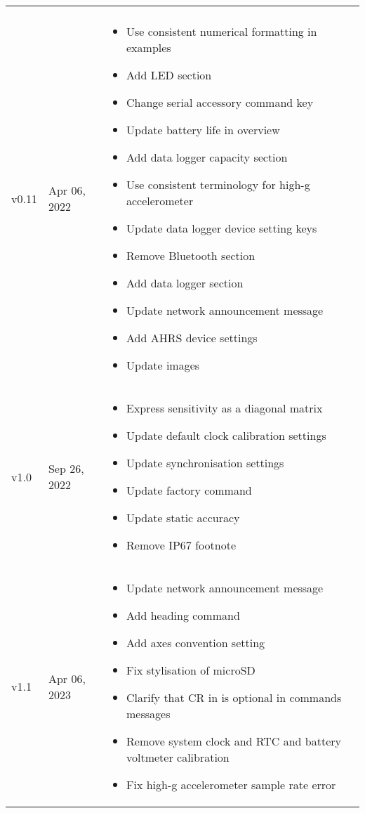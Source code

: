\begin{longtable}{| >{\centering}p{} | p{} | >{\raggedright\arraybackslash}p{} |}
\begin{itemize}
        \end{itemize}\\
        v0.11 & Apr 06, 2022 &
        \begin{itemize}
			\item Use consistent numerical formatting in examples
			\item Add \ac{LED} section
			\item Change serial accessory command key
			\item Update battery life in overview
			\item Add data logger capacity section
			\item Use consistent terminology for high-g accelerometer
			\item Update data logger device setting keys
			\item Remove Bluetooth section
			\item Add data logger section
			\item Update network announcement message
			\item Add AHRS device settings
			\item Update images
		\end{itemize}\\
        v1.0 & Sep 26, 2022 &
        \begin{itemize}
			\item Express sensitivity as a diagonal matrix
			\item Update default clock calibration settings
			\item Update synchronisation settings
			\item Update factory command
			\item Update static accuracy
			\item Remove IP67 footnote
        \end{itemize}\\
        v1.1 & Apr 06, 2023 &
        \begin{itemize}
			\item Update network announcement message
			\item Add heading command
			\item Add axes convention setting
			\item Fix stylisation of \ac{microSD}
			\item Clarify that CR in is optional in commands messages
			\item Remove system clock and \ac{RTC} and battery voltmeter calibration
			\item Fix high-g accelerometer sample rate error

\end{itemize}
\end{longtable}
